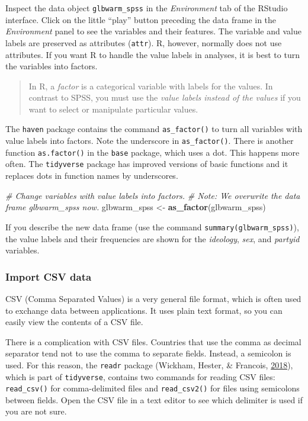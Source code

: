 \documentclass[doc,floatsintext]{apa6}
\newenvironment{Shaded}{\begin{snugshade}}{\end{snugshade}}
\newcommand{\KeywordTok}[1]{\textcolor[rgb]{0.13,0.29,0.53}{\textbf{#1}}}
\newcommand{\StringTok}[1]{\textcolor[rgb]{0.31,0.60,0.02}{#1}}
\newcommand{\CommentTok}[1]{\textcolor[rgb]{0.56,0.35,0.01}{\textit{#1}}}
\newcommand{\NormalTok}[1]{#1}
\begin{document}
Inspect the data object \texttt{glbwarm\_spss} in the \emph{Environment}
tab of the RStudio interface. Click on the little \enquote{play} button
preceding the data frame in the \emph{Environment} panel to see the
variables and their features. The variable and value labels are
preserved as attributes (\texttt{attr}). R, however, normally does not
use attributes. If you want R to handle the value labels in analyses, it
is best to turn the variables into factors.

\begin{quote}
In R, a \emph{factor} is a categorical variable with labels for the
values. In contrast to SPSS, you must use the \emph{value labels instead
of the values} if you want to select or manipulate particular values.
\end{quote}

The \texttt{haven} package contains the command \texttt{as\_factor()} to
turn all variables with value labels into factors. Note the underscore
in \texttt{as\_factor()}. There is another function \texttt{as.factor()}
in the \texttt{base} package, which uses a dot. This happens more often.
The \texttt{tidyverse} package has improved versions of basic functions
and it replaces dots in function names by underscores.

\begin{Shaded}
\begin{Highlighting}[]
\CommentTok{# Change variables with value labels into factors.}
\CommentTok{# Note: We overwrite the data frame glbwarm_spss now.}
\NormalTok{glbwarm_spss <-}\StringTok{ }\KeywordTok{as_factor}\NormalTok{(glbwarm_spss)}
\end{Highlighting}
\end{Shaded}

If you describe the new data frame (use the command
\texttt{summary(glbwarm\_spss)}), the value labels and their frequencies
are shown for the \emph{ideology}, \emph{sex}, and \emph{partyid}
variables.

\subsubsection{Import CSV data}\label{import-csv-data}

CSV (Comma Separated Values) is a very general file format, which is
often used to exchange data between applications. It uses plain text
format, so you can easily view the contents of a CSV file.

There is a complication with CSV files. Countries that use the comma as
decimal separator tend not to use the comma to separate fields. Instead,
a semicolon is used. For this reason, the \texttt{readr} package
(Wickham, Hester, \& Francois, \protect\hyperlink{ref-R-readr}{2018}),
which is part of \texttt{tidyverse}, contains two commands for reading
CSV files: \texttt{read\_csv()} for comma-delimited files and
\texttt{read\_csv2()} for files using semicolons between fields. Open
the CSV file in a text editor to see which delimiter is used if you are
not sure.
\end{document}
